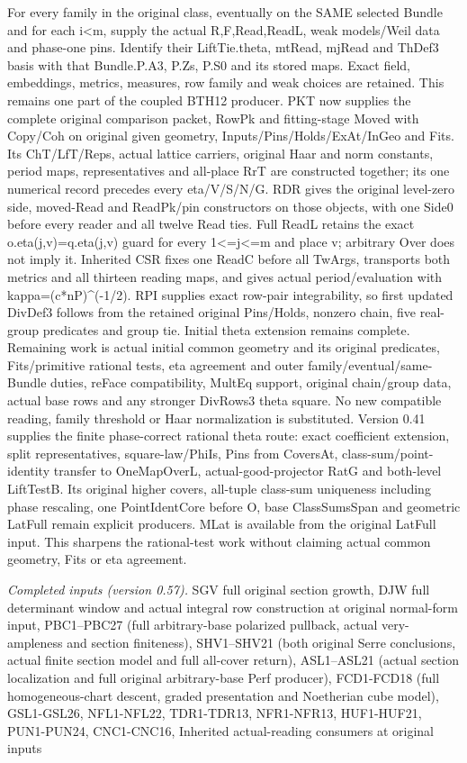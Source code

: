 For every family in the original class, eventually on the SAME selected Bundle and for each i<m, supply the actual R,F,Read,ReadL, weak models/Weil data and phase-one pins. Identify their LiftTie.theta, mtRead, mjRead and ThDef3 basis with that Bundle.P.A3, P.Zs, P.S0 and its stored maps. Exact field, embeddings, metrics, measures, row family and weak choices are retained. This remains one part of the coupled BTH12 producer. PKT now supplies the complete original comparison packet, RowPk and fitting-stage Moved with Copy/Coh on original given geometry, Inputs/Pins/Holds/ExAt/InGeo and Fits. Its ChT/LfT/Reps, actual lattice carriers, original Haar and norm constants, period maps, representatives and all-place RrT are constructed together; its one numerical record precedes every eta/V/S/N/G. RDR gives the original level-zero side, moved-Read and ReadPk/pin constructors on those objects, with one Side0 before every reader and all twelve Read ties. Full ReadL retains the exact o.eta(j,v)=q.eta(j,v) guard for every 1<=j<=m and place v; arbitrary Over does not imply it. Inherited CSR fixes one ReadC before all TwArgs, transports both metrics and all thirteen reading maps, and gives actual period/evaluation with kappa=(c*nP)\textasciicircum{}(-1/2). RPI supplies exact row-pair integrability, so first updated DivDef3 follows from the retained original Pins/Holds, nonzero chain, five real-group predicates and group tie. Initial theta extension remains complete. Remaining work is actual initial common geometry and its original predicates, Fits/primitive rational tests, eta agreement and outer family/eventual/same-Bundle duties, reFace compatibility, MultEq support, original chain/group data, actual base rows and any stronger DivRows3 theta square. No new compatible reading, family threshold or Haar normalization is substituted. Version 0.41 supplies the finite phase-correct rational theta route: exact coefficient extension, split representatives, square-law/PhiIs, Pins from CoversAt, class-sum/point-identity transfer to OneMapOverL, actual-good-projector RatG and both-level LiftTestB. Its original higher covers, all-tuple class-sum uniqueness including phase rescaling, one PointIdentCore before O, base ClassSumsSpan and geometric LatFull remain explicit producers. MLat is available from the original LatFull input. This sharpens the rational-test work without claiming actual common geometry, Fits or eta agreement.

\emph{Completed inputs (version 0.57).} SGV full original section growth, DJW full determinant window and actual integral row construction at original normal-form input, PBC1–PBC27 (full arbitrary-base polarized pullback, actual very-ampleness and section finiteness), SHV1–SHV21 (both original Serre conclusions, actual finite section model and full all-cover return), ASL1–ASL21 (actual section localization and full original arbitrary-base Perf producer), FCD1-FCD18 (full homogeneous-chart descent, graded presentation and Noetherian cube model), GSL1-GSL26, NFL1-NFL22, TDR1-TDR13, NFR1-NFR13, HUF1-HUF21, PUN1-PUN24, CNC1-CNC16, Inherited actual-reading consumers at original inputs

